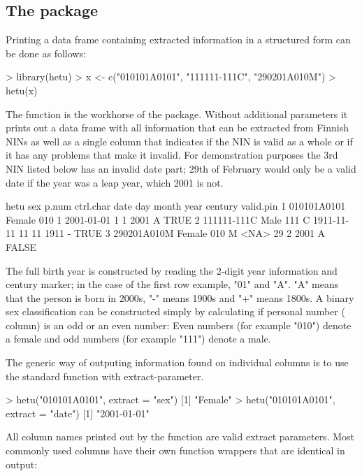 \subsection{The  package}

Printing a data frame containing extracted information in a structured form can be done as follows:

\begin{example}
 > library(hetu)
 > x <- c("010101A0101", "111111-111C", "290201A010M")
 > hetu(x)
\end{example}

The  function is the workhorse of the  package. Without additional parameters it prints out a data frame with all information that can be extracted from Finnish NINs as well as a single column that indicates if the NIN is valid as a whole or if it has any problems that make it invalid. For demonstration purposes the 3rd NIN listed below has an invalid date part; 29th of February would only be a valid date if the year was a leap year, which 2001 is not.

\begin{example}
         hetu    sex p.num ctrl.char       date day month year century valid.pin
1 010101A0101 Female   010         1 2001-01-01   1     1 2001       A      TRUE
2 111111-111C   Male   111         C 1911-11-11  11    11 1911       -      TRUE
3 290201A010M Female   010         M       <NA>  29     2 2001       A     FALSE
\end{example}

The full birth year is constructed by reading the 2-digit year information and century marker; in the case of the first row example, "01" and "A". "A" means that the person is born in 2000s, "-" means 1900s and "+" means 1800s. A binary sex classification can be constructed simply by calculating if personal number ( column) is an odd or an even number: Even numbers (for example "010") denote a female and odd numbers (for example "111") denote a male.

The generic way of outputing information found on individual columns is to use the standard  function with extract-parameter.

\begin{example}
  > hetu("010101A0101", extract = "sex")
  [1] "Female"
  > hetu("010101A0101", extract = "date")
  [1] "2001-01-01"
\end{example}

All column names printed out by the  function are valid extract parameters. Most commonly used columns have their own function wrappers that are identical in output:

